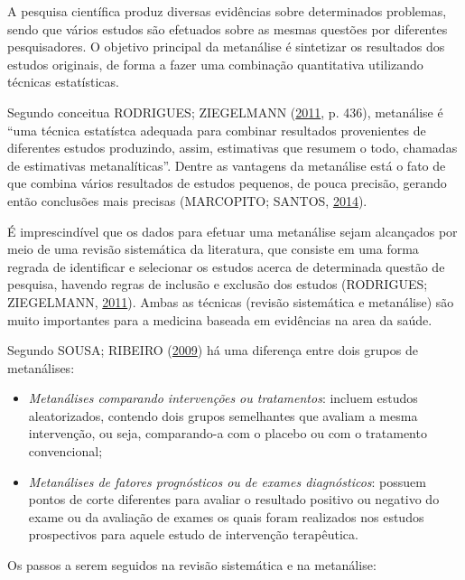 \documentclass[12pt,brazil,oneside]{book}
\begin{document}
A pesquisa científica produz diversas evidências sobre determinados problemas, sendo que vários estudos são efetuados sobre as mesmas questões por diferentes pesquisadores. O objetivo principal da metanálise é sintetizar os resultados dos estudos originais, de forma a fazer uma combinação quantitativa utilizando técnicas estatísticas.

Segundo conceitua RODRIGUES; ZIEGELMANN (\protect\hyperlink{ref-Rodrigues2011}{2011}, p. 436), metanálise é ``uma técnica estatístca adequada para combinar resultados provenientes de diferentes estudos produzindo, assim, estimativas que resumem o todo, chamadas de estimativas metanalíticas''. Dentre as vantagens da metanálise está o fato de que combina vários resultados de estudos pequenos, de pouca precisão, gerando então conclusões mais precisas (MARCOPITO; SANTOS, \protect\hyperlink{ref-Marcopito2014}{2014}).

É imprescindível que os dados para efetuar uma metanálise sejam alcançados por meio de uma revisão sistemática da literatura, que consiste em uma forma regrada de identificar e selecionar os estudos acerca de determinada questão de pesquisa, havendo regras de inclusão e exclusão dos estudos (RODRIGUES; ZIEGELMANN, \protect\hyperlink{ref-Rodrigues2011}{2011}). Ambas as técnicas (revisão sistemática e metanálise) são muito importantes para a medicina baseada em evidências na area da saúde.

Segundo SOUSA; RIBEIRO (\protect\hyperlink{ref-Sousa2009}{2009}) há uma diferença entre dois grupos de metanálises:

\begin{itemize}
\item
  \emph{Metanálises comparando intervenções ou tratamentos}: incluem estudos aleatorizados, contendo dois grupos semelhantes que avaliam a mesma intervenção, ou seja, comparando-a com o placebo ou com o tratamento convencional;
\item
  \emph{Metanálises de fatores prognósticos ou de exames diagnósticos}: possuem pontos de corte diferentes para avaliar o resultado positivo ou negativo do exame ou da avaliação de exames os quais foram realizados nos estudos prospectivos para aquele estudo de intervenção terapêutica.
\end{itemize}

Os passos a serem seguidos na revisão sistemática e na metanálise:
\end{document}
